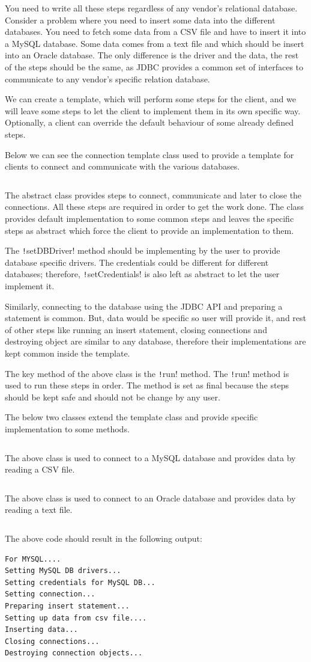 \documentclass[12pt,a4paper,answers]{exam}
\newcommand{\code}{/Users/keith/Documents/Courses/sdp/repo/worksheets/dp-five/scala/src}
\begin{document}
\begin{questions}
You need to write all these steps regardless of any vendor's relational database. 
Consider a problem where you need to insert some data into the different databases. You need to 
fetch some data from a CSV file and have to insert it into a MySQL database. Some data comes from 
a text file and which should be insert into an Oracle database. The only difference is the driver 
and the data, the rest of the steps should be the same, as JDBC provides a common set of 
interfaces to communicate to any vendor's specific relation database.

We can create a template, which will perform some steps for the client, and we will leave 
some steps to let the client to implement them in its own specific way. 
Optionally, a client can override the default behaviour of some already defined steps.

Below we can see the connection template class used to provide a template 
for clients to connect and communicate with the various databases.
\inputminted{scala}{\code/template/ConnectionTemplate.scala}
The abstract class provides steps to connect, communicate and later to close the connections. All 
these steps are required in order to get the work done. The class provides default implementation 
to some common steps and leaves the specific steps as abstract which force the client to provide 
an implementation to them.

The \texttt!setDBDriver! method should be implementing by the user to provide 
database specific drivers. The credentials could be different for different databases; 
therefore, \texttt!setCredentials! is also left as abstract to let the 
user implement it.

Similarly, connecting to the database using the JDBC API and preparing a statement is common.
But, data would be specific so user will provide it, and rest of other steps like running an
insert statement, closing connections and destroying object are similar to any 
database, therefore their implementations are kept common inside the template.

The key method of the above class is the \texttt!run! method. 
The \texttt!run! method is used to run these steps in order. 
The method is set as final because the steps should be kept safe and should not be change 
by any user.

The below two classes extend the template class and provide specific 
implementation to some methods.
\inputminted{scala}{\code/template/MySqLCSVCon.scala}
The above class is used to connect to a MySQL database and provides data by reading a CSV file.
\inputminted{scala}{\code/template/OracleTxtCon.scala}
The above class is used to connect to an Oracle database and provides 
data by reading a text file.
\inputminted{scala}{\code/template/TestTemplatePattern.scala}
The above code should result in the following output:
\begin{Verbatim}
For MYSQL....
Setting MySQL DB drivers...
Setting credentials for MySQL DB...
Setting connection...
Preparing insert statement...
Setting up data from csv file....
Inserting data...
Closing connections...
Destroying connection objects...


\end{Verbatim}
\end{questions}
\end{document}
